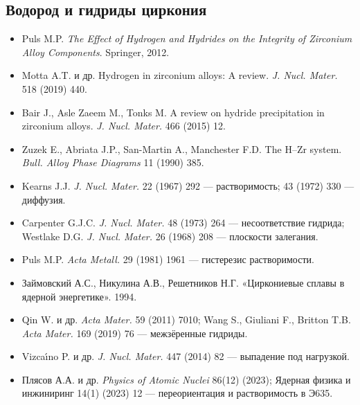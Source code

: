 \subsection*{Водород и гидриды циркония}
\begin{itemize}
\item Puls M.P. \emph{The Effect of Hydrogen and Hydrides on the Integrity of Zirconium Alloy Components}. Springer, 2012.
\item Motta A.T. и др. Hydrogen in zirconium alloys: A review. \emph{J. Nucl. Mater.} 518 (2019) 440.
\item Bair J., Asle Zaeem M., Tonks M. A review on hydride precipitation in zirconium alloys. \emph{J. Nucl. Mater.} 466 (2015) 12.
\item Zuzek E., Abriata J.P., San-Martin A., Manchester F.D. The H--Zr system. \emph{Bull. Alloy Phase Diagrams} 11 (1990) 385.
\item Kearns J.J. \emph{J. Nucl. Mater.} 22 (1967) 292 --- растворимость; 43 (1972) 330 --- диффузия.
\item Carpenter G.J.C. \emph{J. Nucl. Mater.} 48 (1973) 264 --- несоответствие гидрида; Westlake D.G. \emph{J. Nucl. Mater.} 26 (1968) 208 --- плоскости залегания.
\item Puls M.P. \emph{Acta Metall.} 29 (1981) 1961 --- гистерезис растворимости.
\item Займовский А.С., Никулина А.В., Решетников Н.Г. «Циркониевые сплавы в ядерной энергетике». 1994.
\item Qin W. и др. \emph{Acta Mater.} 59 (2011) 7010; Wang S., Giuliani F., Britton T.B. \emph{Acta Mater.} 169 (2019) 76 ---
  межзёренные гидриды.
\item Vizca\'{\i}no P. и др. \emph{J. Nucl. Mater.} 447 (2014) 82 --- выпадение под нагрузкой.
\item Плясов А.А. и др. \emph{Physics of Atomic Nuclei} 86(12) (2023); Ядерная физика и инжиниринг 14(1) (2023) 12 ---
  переориентация и растворимость в Э635.
\end{itemize}
